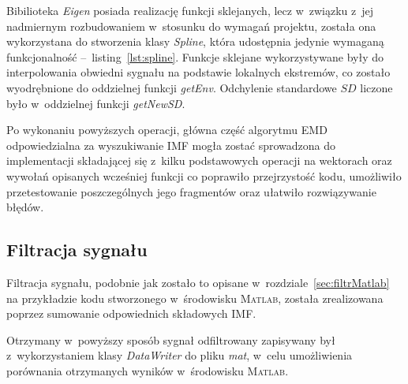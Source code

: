 Bibilioteka \textit{Eigen} posiada realizację funkcji sklejanych, lecz w~związku
z~jej nadmiernym rozbudowaniem w~stosunku do wymagań projektu, została ona
wykorzystana do stworzenia klasy \textit{Spline}, która udostępnia jedynie
wymaganą funkcjonalność --~listing~\ref{lst:spline}. Funkcje sklejane
wykorzystywane były do interpolowania obwiedni sygnału na podstawie lokalnych
ekstremów, co zostało wyodrębnione do oddzielnej funkcji \textit{getEnv}.
Odchylenie standardowe $SD$ liczone było w~oddzielnej funkcji \textit{getNewSD}.

Po wykonaniu powyższych operacji, główna część algorytmu EMD odpowiedzialna za
wyszukiwanie IMF mogła zostać sprowadzona do implementacji składającej się
z~kilku podstawowych operacji na wektorach oraz wywołań opisanych wcześniej
funkcji co poprawiło przejrzystość kodu, umożliwiło przetestowanie
poszczególnych jego fragmentów oraz ułatwiło rozwiązywanie błędów.

\subsection{Filtracja sygnału}
\indent

Filtracja sygnału, podobnie jak zostało to opisane
w~rozdziale~\ref{sec:filtrMatlab} na przykładzie kodu stworzonego w~środowisku
\textsc{Matlab}, została zrealizowana poprzez sumowanie odpowiednich składowych
IMF.

Otrzymany w~powyższy sposób sygnał odfiltrowany zapisywany był z~wykorzystaniem
klasy \textit{DataWriter} do pliku \textit{mat}, w~celu umożliwienia porównania
otrzymanych wyników w~środowisku \textsc{Matlab}.
